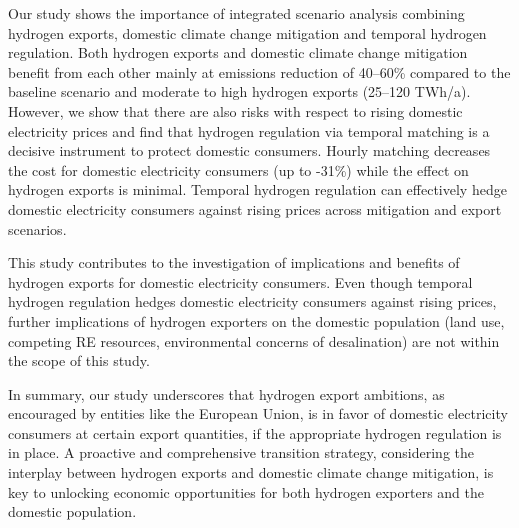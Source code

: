 



Our study shows the importance of integrated scenario analysis combining hydrogen exports, domestic climate change mitigation and temporal hydrogen regulation.
Both hydrogen exports and domestic climate change mitigation benefit from each other mainly at emissions reduction of 40--60\% compared to the baseline scenario and moderate to high hydrogen exports (25--120 TWh/a).
However, we show that there are also risks with respect to rising domestic electricity prices
and find that hydrogen regulation via temporal matching is a decisive instrument
to protect domestic consumers. Hourly matching decreases the cost for domestic electricity consumers (up to -31\%) while the effect on hydrogen exports is minimal. Temporal hydrogen regulation can effectively hedge domestic electricity consumers against rising prices across mitigation and export scenarios. %

This study contributes to the investigation of implications and benefits of hydrogen exports for domestic electricity consumers. Even though temporal hydrogen regulation hedges domestic electricity consumers against rising prices, further implications of hydrogen exporters on the domestic population (land use, competing RE resources, environmental concerns of desalination) are not within the scope of this study.

In summary, our study underscores that hydrogen export ambitions, as encouraged by entities like the European Union, is in favor of domestic electricity consumers at certain export quantities, if the appropriate hydrogen regulation is in place. A proactive and comprehensive transition strategy, considering the interplay between hydrogen exports and domestic climate change mitigation, is key to unlocking economic opportunities for both hydrogen exporters and the domestic population. 


